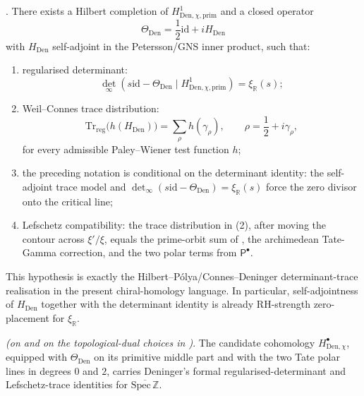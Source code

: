 \begin{conjecture}
\label{v4-arith:3d-acs:conj:spectral-flow}
\ClaimStatusConjectured. There exists a Hilbert completion of
\(H_{\mathrm{Den},\chi,\mathrm{prim}}^{1}\) and a closed operator
\[
\Theta_{\mathrm{Den}}
=\frac12\mathrm{id}+iH_{\mathrm{Den}}
\]
with \(H_{\mathrm{Den}}\) self-adjoint in the Petersson/GNS inner
product, such that:
\begin{enumerate}
\item regularised determinant:
\[
\det_{\infty}\!\left(s\mathrm{id}-\Theta_{\mathrm{Den}}
\mid H_{\mathrm{Den},\chi,\mathrm{prim}}^{1}\right)
=\xi_{\mathbb R}(s);
\]
\item Weil--Connes trace distribution:
\[
\mathrm{Tr}_{\mathrm{reg}}\bigl(h(H_{\mathrm{Den}})\bigr)
=\sum_{\rho}h(\gamma_{\rho}),
\qquad \rho=\frac12+i\gamma_{\rho},
\]
for every admissible Paley--Wiener test function \(h\);
\item the preceding notation is conditional on the determinant
identity: the self-adjoint trace model and
\(\det_{\infty}(s\mathrm{id}-\Theta_{\mathrm{Den}})=\xi_{\mathbb R}(s)\)
force the zero divisor onto the critical line;
\item Lefschetz compatibility: the trace distribution in (2), after
moving the contour across \(\xi'/\xi\), equals the prime-orbit sum of
, the archimedean
Tate-Gamma correction, and the two polar terms from
\(\mathsf P^{\bullet}\).
\end{enumerate}
This hypothesis is exactly the Hilbert--P\'olya/Connes--Deninger
determinant-trace realisation in the present chiral-homology language. In
particular, self-adjointness of \(H_{\mathrm{Den}}\) together with the
determinant identity is already RH-strength zero-placement for
\(\xi_{\mathbb R}\).
\end{conjecture}

\begin{proposition}
\label{v4-arith:3d-acs:thm:conditional-deninger-cohomology}
\ClaimStatusConditional \emph{(on
 and on the topological-dual
choices in )}. The
candidate cohomology
\(H_{\mathrm{Den},\chi}^{\bullet}\), equipped with
\(\Theta_{\mathrm{Den}}\) on its primitive middle part and with the
two Tate polar lines in degrees \(0\) and \(2\), carries Deninger's
formal regularised-determinant and Lefschetz-trace identities for
\(\overline{\mathrm{Spec}\,\mathbb Z}\).
\end{proposition}

